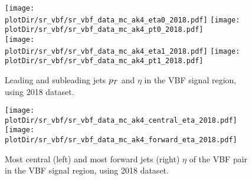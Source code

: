 \begin{figure}[htbp]
    \begin{center}
        \texttt{[image: \\plotDir/sr\_vbf/sr\_vbf\_data\_mc\_ak4\_eta0\_2018.pdf]}
        \texttt{[image: \\plotDir/sr\_vbf/sr\_vbf\_data\_mc\_ak4\_pt0\_2018.pdf]} \\
        \texttt{[image: \\plotDir/sr\_vbf/sr\_vbf\_data\_mc\_ak4\_eta1\_2018.pdf]}
        \texttt{[image: \\plotDir/sr\_vbf/sr\_vbf\_data\_mc\_ak4\_pt1\_2018.pdf]}
    \end{center}
    \caption{Leading and subleading jets $p_T$ and $\eta$ in the VBF signal region, using 2018 dataset.}
    \label{fig:SR_jets_vbfhinv_2018_mtr}
\end{figure}

\begin{figure}[htbp]
    \begin{center}
        \texttt{[image: \\plotDir/sr\_vbf/sr\_vbf\_data\_mc\_ak4\_central\_eta\_2018.pdf]}
        \texttt{[image: \\plotDir/sr\_vbf/sr\_vbf\_data\_mc\_ak4\_forward\_eta\_2018.pdf]}
    \end{center}
    \caption{Most central (left) and most forward jets (right) $\eta$ of the VBF pair in the VBF signal region, using 2018 dataset.}
    \label{fig:SR_eta_vbfhinv_2018_mtr}
\end{figure}




